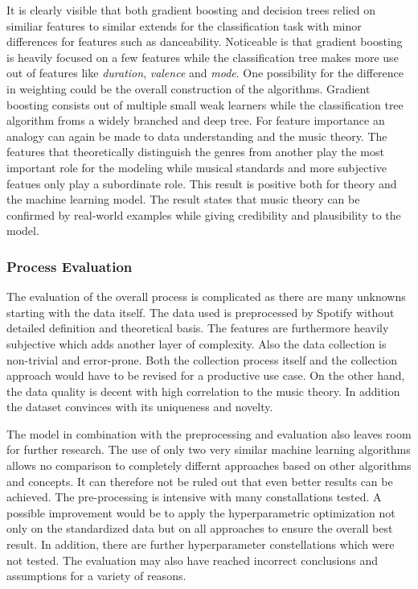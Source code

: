It is clearly visible that both gradient boosting and decision trees relied on similiar features to similar extends for the classification task with 
minor differences for features such as danceability. Noticeable is that gradient boosting is heavily focused on a few features 
while the classification tree makes more use out of features like \emph{duration}, \emph{valence} and \emph{mode}. One possibility for the difference in weighting  
could be the overall construction of the algorithms. Gradient boosting consists out of multiple small weak learners while the classification tree
algorithm froms a widely branched and deep tree. For feature importance an analogy can again be made to data understanding and the music theory. 
The features that theoretically distinguish the genres from another play the most important role for the modeling while musical standards and 
more subjective featues only play a subordinate role. This result is positive both for theory and the machine learning model. The result states 
that music theory can be confirmed by real-world examples while giving credibility and plausibility to the model.

\subsubsection{Process Evaluation}

The evaluation of the overall process is complicated as there are many unknowns starting with the data itself. The data used is preprocessed by 
Spotify without detailed definition and theoretical basis. The features are furthermore heavily subjective which adds another layer of 
complexity. Also the data collection is non-trivial and error-prone. Both the collection process itself and the collection approach 
would have to be revised for a productive use case. On the other hand, the data quality is decent with high correlation to the music 
theory. In addition the dataset convinces with its uniqueness and novelty.

The model in combination with the preprocessing and evaluation also leaves room for further research. The use of only two very 
similar machine learning algorithms allows no comparison to completely differnt approaches based on other algorithms and concepts. 
It can therefore not be ruled out that even better results can be achieved. The pre-processing is intensive with many constallations 
tested. A possible improvement would be to apply the hyperparametric optimization not only on the standardized data but on all 
approaches to ensure the overall best result. In addition, there are further hyperparameter constellations which were not tested.
The evaluation may also have reached incorrect conclusions and assumptions for a variety of reasons. 

